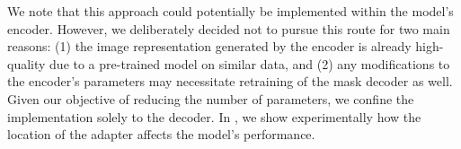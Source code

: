 

We note that this approach could potentially be implemented within the model's encoder. However, we deliberately decided not to pursue this route for two main reasons: (1) the image representation generated by the encoder is already high-quality due to a pre-trained model on similar data, and (2) any modifications to the encoder's parameters may necessitate retraining of the mask decoder as well. Given our objective of reducing the number of parameters, we confine the implementation solely to the decoder. In , we show experimentally how the location of the adapter affects the model's performance.
